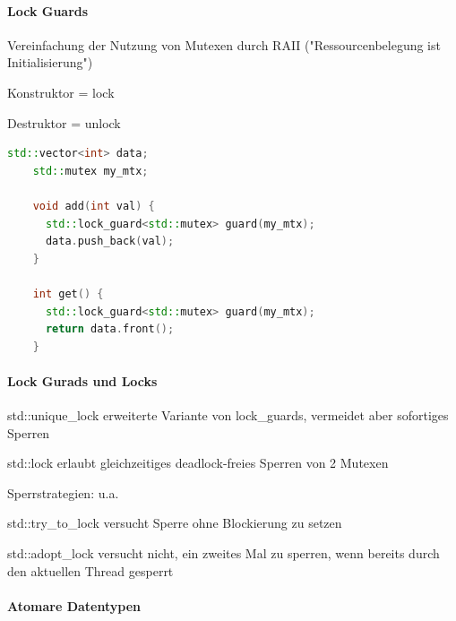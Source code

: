 \documentclass[10pt]{article}
\begin{document}
  \paragraph{Lock Guards}
  
  \begin{itemize*}
    \item Vereinfachung der Nutzung von Mutexen durch RAII ("Ressourcenbelegung ist Initialisierung")
    \item Konstruktor = lock
    \item Destruktor = unlock
  \end{itemize*}
  
  \begin{lstlisting}[language=C++]
    std::vector<int> data;
    std::mutex my_mtx;
  
    void add(int val) {
      std::lock_guard<std::mutex> guard(my_mtx);
      data.push_back(val);
    }
  
    int get() {
      std::lock_guard<std::mutex> guard(my_mtx);
      return data.front();
    }
    \end{lstlisting}
  
  \paragraph{Lock Gurads und Locks}
  
  \begin{itemize*}
    \item std::unique\_lock erweiterte Variante von lock\_guards, vermeidet aber sofortiges Sperren
    \item std::lock erlaubt gleichzeitiges deadlock-freies Sperren von 2 Mutexen
    \item Sperrstrategien: u.a.
    \begin{itemize*}
      \item std::try\_to\_lock versucht Sperre ohne Blockierung zu setzen
      \item std::adopt\_lock versucht nicht, ein zweites Mal zu sperren, wenn bereits durch den aktuellen Thread gesperrt
    \end{itemize*}
  \end{itemize*}
  
  \paragraph{Atomare Datentypen}
  
\end{document}
